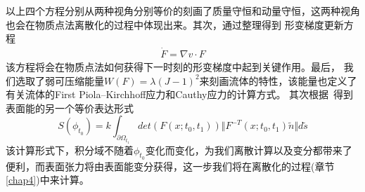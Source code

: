 以上四个方程分别从两种视角分别等价的刻画了质量守恒和动量守恒，这两种视角也会在物质点法离散化的过程中体现出来。其次，通过整理得到
形变梯度更新方程~\cite{jiang2016material}
\begin{align*}
    \dot{F} = \nabla v \cdot F
\end{align*}
该方程将会在物质点法如何获得下一时刻的形变梯度中起到关键作用。最后，
我们选取了弱可压缩能量$W(F)=\lambda (J-1)^2$来刻画流体的特性，该能量也定义了有关流体的First Piola–Kirchhoff应力和Cauthy应力的计算方式。
其次根据~\cite{popinet2018numerical}\cite{hyde2020implicit}得到表面能的另一个等价表达形式
$$S(\phi_{t_0}) = k \int_{\partial \Omega_{t_1}} det(F(x;t_0,t_1)) \Vert F^{-T}(x;t_0,t_1)\tilde{n}\Vert d\tilde{s}$$
该计算形式下，积分域不随着$\phi_{t_0}$变化而变化，为我们离散计算以及变分都带来了便利，而表面张力将由表面能变分获得，这一步我们将在离散化的过程(章节\ref{chap4})中来计算。







